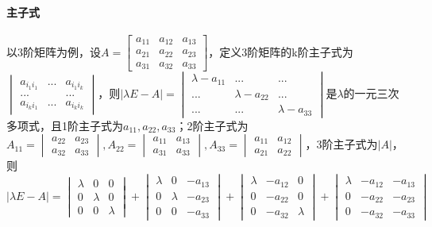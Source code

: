 \paragraph{主子式}
以3阶矩阵为例，设\(A = \begin{bmatrix}
a_{11} & a_{12} & a_{13} \\ 
a_{21} & a_{22} & a_{23} \\ 
a_{31} & a_{32} & a_{33}
\end{bmatrix}\)，定义3阶矩阵的k阶主子式为\(\begin{vmatrix}
    a_{i_1i_1} & ... & a_{i_1i_k} \\ 
    ... & & ... \\ 
    a_{i_ki_1} & ... & a_{i_ki_k}
\end{vmatrix}\)，则\(|\lambda E - A| = \begin{vmatrix}
    \lambda - a_{11} & ... & ... \\ 
    ... & \lambda - a_{22} & ... \\ 
    ... & ... & \lambda - a_{33}
\end{vmatrix}\)是\(\lambda\)的一元三次多项式，且1阶主子式为\(a_{11}, a_{22}, a_{33}\)；2阶主子式为\(A_{11} = \begin{vmatrix}
    a_22 & a_23 \\ 
    a_32 & a_33
\end{vmatrix}, A_{22} = \begin{vmatrix}
    a_{11} & a_{13} \\ 
    a_{31} & a_{33}
\end{vmatrix}, A_{33} = \begin{vmatrix}
    a_{11} & a_{12} \\ 
    a_{21} & a_{22}
\end{vmatrix}\)，3阶主子式为\(|A|\)，则
\[|\lambda E - A| = 
\begin{vmatrix}
    \lambda & 0 & 0 \\ 
    0 & \lambda & 0 \\ 
    0 & 0 & \lambda
\end{vmatrix} + \begin{vmatrix}
    \lambda & 0 & -a_{13} \\ 
    0 & \lambda & -a_{23} \\ 
    0 & 0 & -a_{33}
\end{vmatrix} + \begin{vmatrix}
    \lambda & -a_{12} & 0 \\ 
    0 & -a_{22} & 0 \\ 
    0 & -a_{32} & \lambda
\end{vmatrix} + \begin{vmatrix}
    \lambda & -a_{12} & -a_{13} \\ 
    0 & -a_{22} & -a_{23} \\ 
    0 & -a_{32} & -a_{33}
\end{vmatrix}\]
